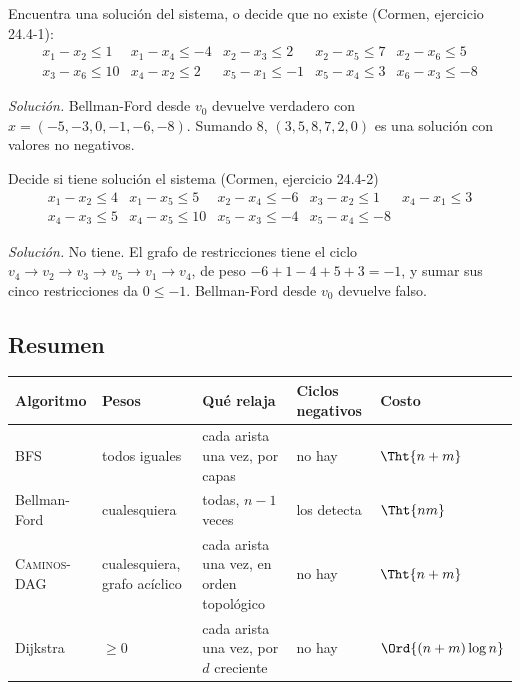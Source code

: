 \documentclass[11pt,letterpaper]{article}
\begin{document}
\begin{ejercicio}
  Encuentra una solución del sistema, o decide que no existe (Cormen,
  ejercicio 24.4-1):
  \[
    \begin{array}{lllll}
      x_1 - x_2 \le 1 & x_1 - x_4 \le -4 & x_2 - x_3 \le 2
        & x_2 - x_5 \le 7 & x_2 - x_6 \le 5 \\
      x_3 - x_6 \le 10 & x_4 - x_2 \le 2 & x_5 - x_1 \le -1
        & x_5 - x_4 \le 3 & x_6 - x_3 \le -8
    \end{array}
  \]

  \textit{Solución.} Bellman-Ford desde $v_0$ devuelve verdadero con
  $x = (-5, -3, 0, -1, -6, -8)$. Sumando $8$, $(3, 5, 8, 7, 2, 0)$ es
  una solución con valores no negativos.
\end{ejercicio}

\begin{ejercicio}
  Decide si tiene solución el sistema (Cormen, ejercicio 24.4-2)
  \[
    \begin{array}{lllll}
      x_1 - x_2 \le 4 & x_1 - x_5 \le 5 & x_2 - x_4 \le -6
        & x_3 - x_2 \le 1 & x_4 - x_1 \le 3 \\
      x_4 - x_3 \le 5 & x_4 - x_5 \le 10 & x_5 - x_3 \le -4
        & x_5 - x_4 \le -8 &
    \end{array}
  \]

  \textit{Solución.} No tiene. El grafo de restricciones tiene el
  ciclo $v_4 \to v_2 \to v_3 \to v_5 \to v_1 \to v_4$, de peso
  $-6 + 1 - 4 + 5 + 3 = -1$, y sumar sus cinco restricciones da
  $0 \le -1$. Bellman-Ford desde $v_0$ devuelve falso.
\end{ejercicio}


\subsection*{Resumen}

\begin{center}
\small
\begin{tabular}{l>{\raggedright\arraybackslash}p{2.5cm}%
                 >{\raggedright\arraybackslash}p{3.3cm}%
                 >{\raggedright\arraybackslash}p{2.6cm}l}
  \toprule
  \textbf{Algoritmo} & \textbf{Pesos} & \textbf{Qué relaja}
    & \textbf{Ciclos negativos} & \textbf{Costo} \\
  \midrule
  BFS & todos iguales & cada arista una vez, por capas & no hay
    & $\Tht{n + m}$ \\
  \addlinespace
  Bellman-Ford & cualesquiera & todas, $n - 1$ veces
    & los detecta & $\Tht{nm}$ \\
  \addlinespace
  \textsc{Caminos-DAG} & cualesquiera, grafo acíclico
    & cada arista una vez, en orden topológico & no hay
    & $\Tht{n + m}$ \\
  \addlinespace
  Dijkstra & $\ge 0$ & cada arista una vez, por $d$ creciente
    & no hay & $\Ord{(n + m)\log n}$ \\
  \bottomrule
\end{tabular}
\end{center}
\end{document}
